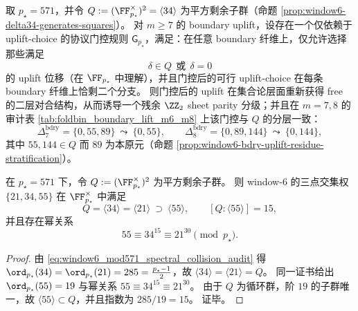 \begin{conjecture}\label{conj:window6-pstar-parity-restoration-gate}
取 \(p_\star=571\)，并令 \(Q:=(\FF_{p_\star}^\times)^2=\langle 34\rangle\) 为平方剩余子群（命题 \ref{prop:window6-delta34-generates-squares}）。
对 \(m\ge 7\) 的 boundary uplift，设存在一个仅依赖于 uplift-choice 的协议门控规则 \(\mathsf G_{p_\star}\)，满足：在任意 boundary 纤维上，仅允许选择那些满足
\[
\delta\in Q\ \ \text{或}\ \ \delta=0
\]
的 uplift 位移（在 \(\FF_{p_\star}\) 中理解），并且门控后的可行 uplift-choice 在每条 boundary 纤维上恰剩二个分支。
则门控后的 uplift 在集合论层面重新获得 free 的二层对合结构，从而诱导一个残余 \(\ZZ_2\) sheet parity 分级；并且在 \(m=7,8\) 的审计表 \ref{tab:foldbin_boundary_lift_m6_m8} 上该门控与 \(Q\) 的分层一致：
\[
\Delta_7^{\mathrm{bdry}}=\{0,55,89\}\ \leadsto\ \{0,55\},
\qquad
\Delta_8^{\mathrm{bdry}}=\{0,89,144\}\ \leadsto\ \{0,144\},
\]
其中 \(55,144\in Q\) 而 \(89\) 为本原元（命题 \ref{prop:window6-bdry-uplift-residue-stratification}）。
\end{conjecture}

\begin{corollary}\label{cor:window6-three-point-weight-residue-filtration}
在 \(p_\star=571\) 下，令 \(Q:=(\FF_{p_\star}^\times)^2\) 为平方剩余子群。
则 window-\(6\) 的三点交集权 \(\{21,34,55\}\) 在 \(\FF_{p_\star}^\times\) 中满足
\[
Q=\langle 34\rangle=\langle 21\rangle\ \supset\ \langle 55\rangle,
\qquad [Q:\langle 55\rangle]=15,
\]
并且存在幂关系
\[
55\equiv 34^{15}\equiv 21^{30}\pmod{p_\star}.
\]
\end{corollary}
\begin{proof}
由 \eqref{eq:window6_mod571_spectral_collision_audit} 得 \(\ord_{p_\star}(34)=\ord_{p_\star}(21)=285=\frac{p_\star-1}{2}\)，故 \(\langle 34\rangle=\langle 21\rangle=Q\)。
同一证书给出 \(\ord_{p_\star}(55)=19\) 与幂关系 \(55\equiv 34^{15}\equiv 21^{30}\)。
由于 \(Q\) 为循环群，阶 \(19\) 的子群唯一，故 \(\langle 55\rangle\subset Q\)，并且指数为 \(285/19=15\)。
证毕。
\end{proof}

